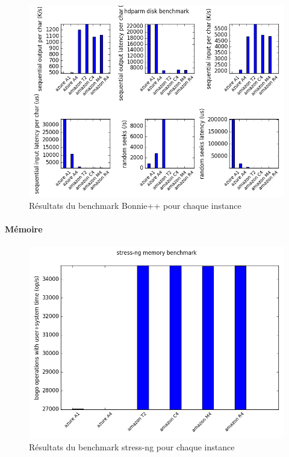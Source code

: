 \begin{figure}[h]
  \begin{center}
    \includegraphics[width=\textwidth]{plot_IOPS.png}
    \caption{Résultats du benchmark Bonnie++ pour chaque instance}
    \label{fig:iops}
  \end{center}
\end{figure}

\paragraph{Mémoire}

\begin{figure}[h]
  \begin{center}
    \includegraphics[width=\textwidth]{plot_memory.png}
    \caption{Résultats du benchmark stress-ng pour chaque instance}
    \label{fig:memoire}
  \end{center}
\end{figure}

